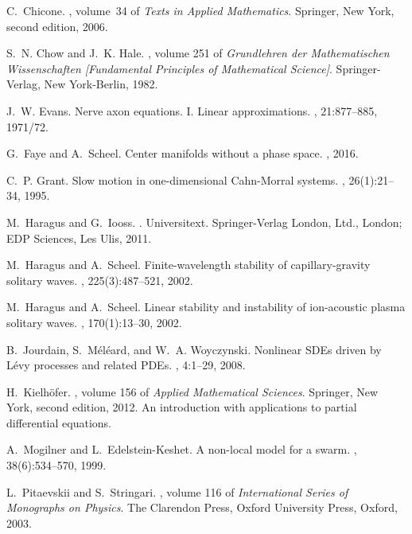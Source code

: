 \begin{thebibliography}{10}
C.~Chicone.
, volume~34 of
  {\em Texts in Applied Mathematics}.
\newblock Springer, New York, second edition, 2006.

S.~N. Chow and J.~K. Hale.
, volume 251 of {\em Grundlehren
  der Mathematischen Wissenschaften [Fundamental Principles of Mathematical
  Science]}.
\newblock Springer-Verlag, New York-Berlin, 1982.

J.~W. Evans.
\newblock Nerve axon equations. {I}. {L}inear approximations.
, 21:877--885, 1971/72.

G.~Faye and A.~Scheel.
\newblock Center manifolds without a phase space.
, 2016.

C.~P. Grant.
\newblock Slow motion in one-dimensional {C}ahn-{M}orral systems.
, 26(1):21--34, 1995.

M.~Haragus and G.~Iooss.
.
\newblock Universitext. Springer-Verlag London, Ltd., London; EDP Sciences, Les
  Ulis, 2011.

M.~Haragus and A.~Scheel.
\newblock Finite-wavelength stability of capillary-gravity solitary waves.
, 225(3):487--521, 2002.

M.~Haragus and A.~Scheel.
\newblock Linear stability and instability of ion-acoustic plasma solitary
  waves.
, 170(1):13--30, 2002.

B.~Jourdain, S.~M\'el\'eard, and W.~A. Woyczynski.
\newblock Nonlinear {SDE}s driven by {L}\'evy processes and related {PDE}s.
, 4:1--29, 2008.

H.~Kielh\"ofer.
, volume 156 of {\em Applied Mathematical
  Sciences}.
\newblock Springer, New York, second edition, 2012.
\newblock An introduction with applications to partial differential equations.

A.~Mogilner and L.~Edelstein-Keshet.
\newblock A non-local model for a swarm.
, 38(6):534--570, 1999.

L.~Pitaevskii and S.~Stringari.
, volume 116 of {\em International
  Series of Monographs on Physics}.
\newblock The Clarendon Press, Oxford University Press, Oxford, 2003.


\end{thebibliography}
